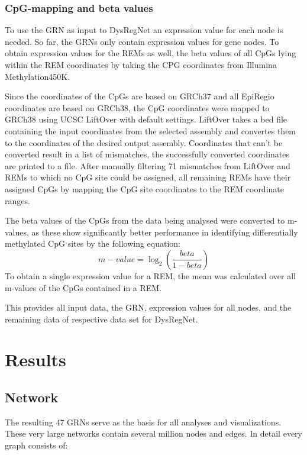 \documentclass[pdftex,12pt,a4paper]{report}
\begin{document}
\subsection{CpG-mapping and beta values}
\label{beta values}
To use the GRN as input to DysRegNet an expression value for each node is needed. So far, the GRNs only contain expression values for gene nodes. To obtain expression values for the REMs as well, the beta values of all CpGs lying within the REM coordinates  by taking the CPG coordinates from Illumina Methylation450K\cite{methylation450}. 

Since the coordinates of the CpGs are based on GRCh37 and all EpiRegio coordinates are based on GRCh38, the CpG coordinates were mapped to GRCh38 using UCSC LiftOver with default settings\cite{liftover}. LiftOver takes a bed file containing the input coordinates from the selected assembly and convertes them to the coordinates of the desired output assembly. Coordinates that can't be converted result in a list of mismatches, the successfully converted coordinates are printed to a file. After manually filtering 71 mismatches from LiftOver and REMs to which no CpG site could be assigned, all remaining REMs have their assigned CpGs by mapping the CpG site coordinates to the REM coordinate ranges.

The beta values of the CpGs from the data being analysed were converted to m-values, as these show significantly better performance in identifying differentially methylated CpG sites\cite{mvalues} by the following equation:
\begin{equation}
	m-value = \log_{2}{(\frac{beta}{1-beta})}
\end{equation}
To obtain a single expression value for a REM, the mean was calculated over all m-values of the CpGs contained in a REM.

This provides all input data, the GRN, expression values for all nodes, and the remaining data of respective data set for DysRegNet.

\chapter{Results}
\section{Network}
The resulting 47 GRNs serve as the basis for all analyses and visualizations. These very large networks contain several million nodes and edges. In detail every graph consists of:
\end{document}
